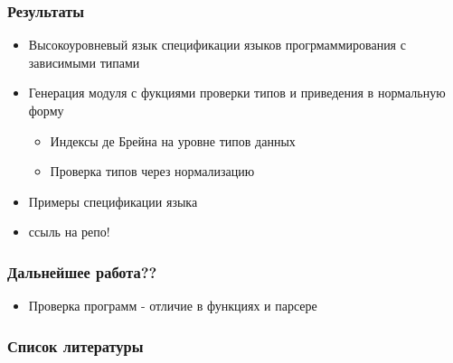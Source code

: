 \documentclass[14pt]{beamer}
\begin{document}
\begin{frame}
\frametitle{Результаты}
\begin{itemize}
  \item Высокоуровневый язык спецификации языков прогрмаммирования с зависимыми типами
  \item Генерация модуля с фукциями проверки типов и приведения в нормальную форму
  \begin{itemize}
    \item Индексы де Брейна на уровне типов данных
    \item Проверка типов через нормализацию
  \end{itemize}
  \item Примеры спецификации языка
  \item ссыль на репо!
\end{itemize}
\end{frame}

\begin{frame}
\frametitle{Дальнейшее работа??}
\begin{itemize}
  \item Проверка программ - отличие в функциях и парсере
\end{itemize}
\end{frame}

\begin{frame}[shrink=20]
\frametitle{Список литературы}
\printbibliography
\end{frame}
\end{document}
